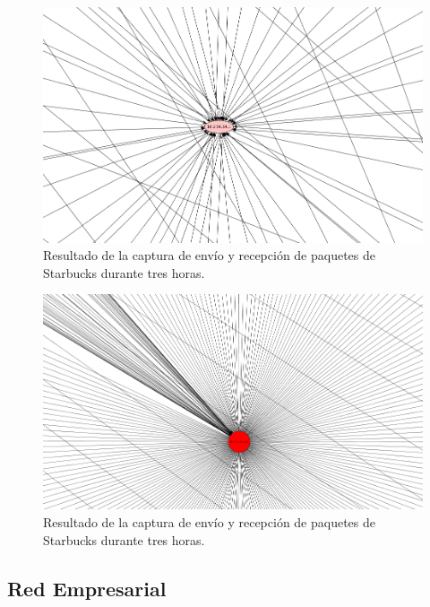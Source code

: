 \documentclass[10pt, a4paper]{article}
\begin{document}
\begin{figure}[H] %
\begin{center}
\includegraphics[width=400pt]{../imgs/starbucks30_2.png}
\caption{Resultado de la captura de envío y recepción de paquetes de Starbucks durante tres horas.}
\end{center}
\end{figure}

\begin{figure}[H] %
\begin{center}
\includegraphics[width=400pt]{../imgs/starbucks30_3.png}
\caption{Resultado de la captura de envío y recepción de paquetes de Starbucks durante tres horas.}
\end{center}
\end{figure}


\subsection{Red Empresarial}
\end{document}
